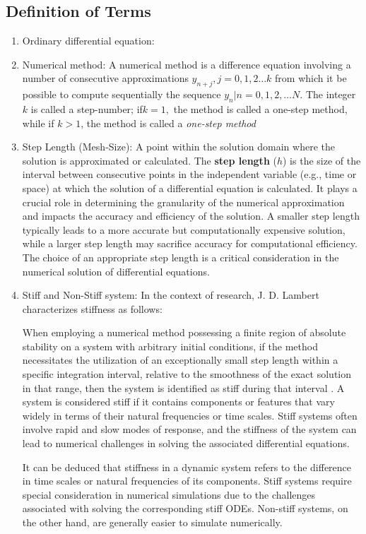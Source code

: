 \documentclass{report}
\begin{document}
\subsection{Definition of Terms}
\begin{enumerate}
  \item Ordinary differential equation:
  \item Numerical method: A numerical method is a difference equation involving a number of consecutive approximations $y_{n+j}, j = 0,1,2 \dots k$ from which it be possible to compute sequentially the sequence ${y_{n}|n = 0,1,2, \dots N}$. The integer $k$ is called a step-number; if$k=1,$ the method is called a one-step method, while if $k>1$, the method is called a \textit{one-step method}
  \item Step Length (Mesh-Size): A point within the solution domain where the solution is approximated or calculated. The \textbf{step length} (\(h\)) is the size of the interval between consecutive points in the independent variable (e.g., time or space) at which the solution of a differential equation is calculated. It plays a crucial role in determining the granularity of the numerical approximation and impacts the accuracy and efficiency of the solution. A smaller step length typically leads to a more accurate but computationally expensive solution, while a larger step length may sacrifice accuracy for computational efficiency. The choice of an appropriate step length is a critical consideration in the numerical solution of differential equations.
  \item Stiff and Non-Stiff system: 
  In the context of research, J. D. Lambert characterizes stiffness as follows:

  When employing a numerical method possessing a finite region of absolute stability on a system with arbitrary initial conditions, if the method necessitates the utilization of an exceptionally small step length within a specific integration interval, relative to the smoothness of the exact solution in that range, then the system is identified as stiff during that interval \cite{lambert1977}.
  A system is considered stiff if it contains components or features that vary widely in terms of their natural frequencies or time scales. Stiff systems often involve rapid and slow modes of response, and the stiffness of the system can lead to numerical challenges in solving the associated differential equations.


  It can be deduced that stiffness in a dynamic system refers to the difference in time scales or natural frequencies of its components. Stiff systems require special consideration in numerical simulations due to the challenges associated with solving the corresponding stiff ODEs. Non-stiff systems, on the other hand, are generally easier to simulate numerically.


\end{enumerate}
\end{document}
